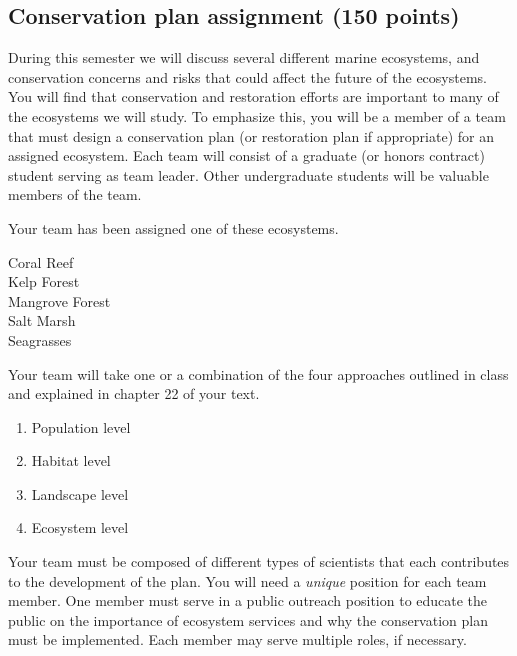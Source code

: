 \documentclass[12pt, hidelinks]{exam}
\begin{document}
\subsection*{Conservation plan assignment (150 points)}

During this semester we will discuss several different marine 
ecosystems, and conservation concerns and risks that could 
affect the future of the ecosystems. You will find that
conservation and restoration efforts are important to many of the
ecosystems we will study. To emphasize this, you will be a member of a team
that must design a conservation plan (or restoration plan if appropriate) for an assigned ecosystem.
Each team will consist of a graduate (or honors contract) student serving as team leader. Other undergraduate students will be valuable members of the team.

Your team has been assigned one of these ecosystems.%

\begin{multicols}{3}

Coral Reef\\ 
Kelp Forest\\ 
Mangrove Forest\\
Salt Marsh\\
Seagrasses

\end{multicols}

Your team will take one or a combination of the four approaches outlined in class and explained in chapter 22 of your text.

\begin{multicols}{2}
\begin{enumerate}
\def\labelenumi{\arabic{enumi}.}
\item
  Population level
\item
  Habitat level
\item
  Landscape level
\item
  Ecosystem level
\end{enumerate}
\end{multicols}

Your team must be composed of different types of scientists that each contributes
to the development of the plan. You will need a \emph{unique} position for each team member. One member must serve in a public outreach position to educate the public on the importance of ecosystem services and why the conservation plan must be implemented. Each member may serve multiple roles, if necessary.
\end{document}
